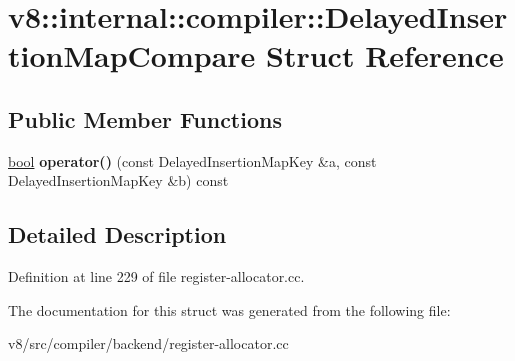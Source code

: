 \hypertarget{structv8_1_1internal_1_1compiler_1_1DelayedInsertionMapCompare}{}\section{v8\+:\+:internal\+:\+:compiler\+:\+:Delayed\+Insertion\+Map\+Compare Struct Reference}
\label{structv8_1_1internal_1_1compiler_1_1DelayedInsertionMapCompare}
\subsection*{Public Member Functions}
\begin{DoxyCompactItemize}
\item 
\mbox{\label{structv8_1_1internal_1_1compiler_1_1DelayedInsertionMapCompare_acd451006e810df4f8b52fec6053a7fb5}} 
\mbox{\hyperlink{classbool}{bool}} {\bfseries operator()} (const Delayed\+Insertion\+Map\+Key \&a, const Delayed\+Insertion\+Map\+Key \&b) const
\end{DoxyCompactItemize}


\subsection{Detailed Description}


Definition at line 229 of file register-\/allocator.\+cc.



The documentation for this struct was generated from the following file\+:\begin{DoxyCompactItemize}
\item 
v8/src/compiler/backend/register-\/allocator.\+cc\end{DoxyCompactItemize}
